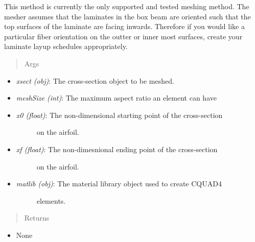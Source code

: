 \documentclass[letterpaper,10pt,english]{sphinxmanual}
\begin{document}
\begin{fulllineitems}
\begin{fulllineitems}
This method is currently the only supported and tested meshing method.
The mesher assumes that the laminates in the box beam are oriented such
that the top surfaces of the laminate are facing inwards. Therefore if
you would like a particular fiber orientation on the outter or inner
most surfaces, create your laminate layup schedules appropriately.
\begin{quote}\begin{description}
\item[{Args}] \leavevmode
\end{description}\end{quote}
\begin{itemize}
\item {} 
\emph{xsect (obj)}: The cross-section object to be meshed.

\item {} 
\emph{meshSize (int)}: The maximum aspect ratio an element can have

\item {} \begin{description}
\item[{\emph{x0 (float)}: The non-dimensional starting point of the cross-section}] \leavevmode
on the airfoil.

\end{description}

\item {} \begin{description}
\item[{\emph{xf (float)}: The non-dimesnional ending point of the cross-section}] \leavevmode
on the airfoil.

\end{description}

\item {} \begin{description}
\item[{\emph{matlib (obj)}: The material library object used to create CQUAD4}] \leavevmode
elements.

\end{description}

\end{itemize}
\begin{quote}\begin{description}
\item[{Returns}] \leavevmode
\end{description}\end{quote}
\begin{itemize}
\item {} 
None

\end{itemize}

\end{fulllineitems}


\end{fulllineitems}
\end{document}
